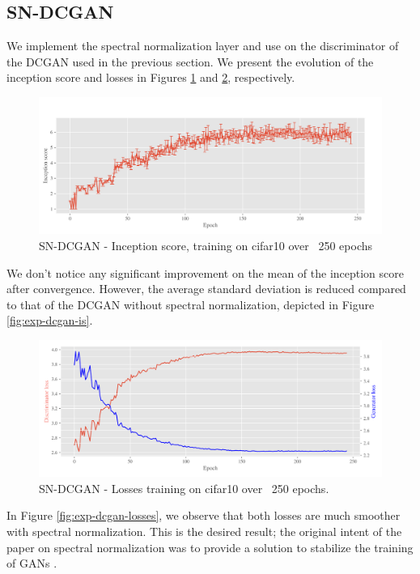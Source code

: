 \subsection{SN-DCGAN}
\label{sec:exp-sndcgan}
We implement the spectral normalization layer and use on the discriminator of the DCGAN used in the previous section. We present the evolution of the inception score and losses in Figures \ref{fig:exp-sndcgan-is} and \ref{fig:exp-sndcgan-losses}, respectively.
   
\begin{figure}[h]
\centering
\includegraphics[width=\textwidth]{../code/results/figures/sndcgan_cifar10_is.png}
\caption{SN-DCGAN - Inception score, training on cifar10 over ~250 epochs}
\label{fig:exp-sndcgan-is}
\end{figure}
We don't notice any significant improvement on the mean of the inception score after convergence. However, the average standard deviation is reduced compared to that of the DCGAN without spectral normalization, depicted in Figure \ref{fig:exp-dcgan-is}.
\begin{figure}[h]
\centering
\includegraphics[width=\textwidth]{../code/results/figures/sndcgan_cifar10_losses.png}
\caption{SN-DCGAN - Losses training on cifar10 over ~250 epochs.}
\label{fig:exp-sndcgan-losses}
\end{figure}
In Figure \ref{fig:exp-dcgan-losses}, we observe that both losses are much smoother with spectral normalization. This is the desired result; the original intent of the paper on spectral normalization was to provide a solution to stabilize the training of GANs \cite{miyato2018spectral}. 